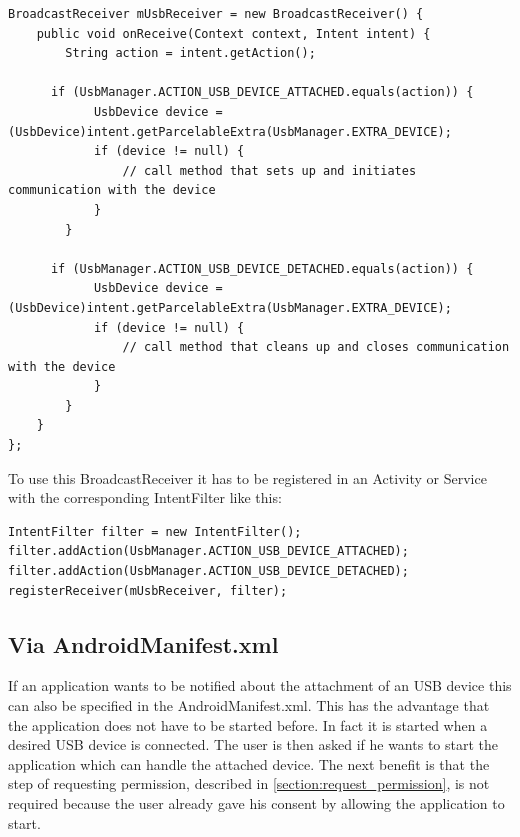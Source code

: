 \begin{lstlisting}[caption=Attach and detach notification of USB devices via BroadcastReceivers, label=listing:attach_broadcast]
BroadcastReceiver mUsbReceiver = new BroadcastReceiver() {
    public void onReceive(Context context, Intent intent) {
        String action = intent.getAction(); 

      if (UsbManager.ACTION_USB_DEVICE_ATTACHED.equals(action)) {
            UsbDevice device = (UsbDevice)intent.getParcelableExtra(UsbManager.EXTRA_DEVICE);
            if (device != null) {
                // call method that sets up and initiates communication with the device
            }
        }

      if (UsbManager.ACTION_USB_DEVICE_DETACHED.equals(action)) {
            UsbDevice device = (UsbDevice)intent.getParcelableExtra(UsbManager.EXTRA_DEVICE);
            if (device != null) {
                // call method that cleans up and closes communication with the device
            }
        }
    }
};
\end{lstlisting}

To use this BroadcastReceiver it has to be registered in an Activity or Service with the corresponding IntentFilter like this:

\begin{lstlisting}[caption=Register the BroadcastReceiver with the desired actions, label=listing:attach_register]
IntentFilter filter = new IntentFilter();
filter.addAction(UsbManager.ACTION_USB_DEVICE_ATTACHED);
filter.addAction(UsbManager.ACTION_USB_DEVICE_DETACHED);
registerReceiver(mUsbReceiver, filter);
\end{lstlisting}

\subsection{Via AndroidManifest.xml}

If an application wants to be notified about the attachment of an USB device this can also be specified in the AndroidManifest.xml. This has the advantage that the application does not have to be started before. In fact it is started when a desired USB device is connected. The user is then asked if he wants to start the application which can handle the attached device. The next benefit is that the step of requesting permission, described in \ref{section:request_permission}, is not required because the user already gave his consent by allowing the application to start.


